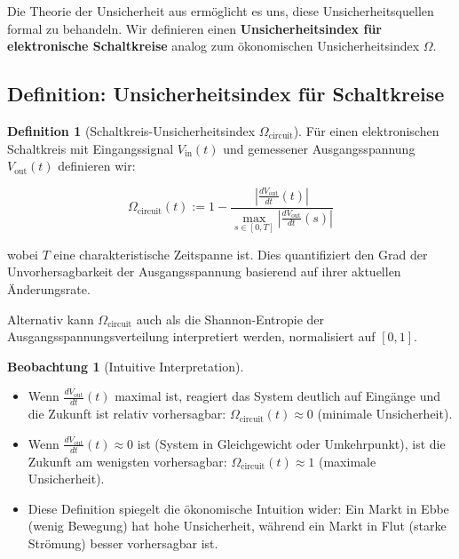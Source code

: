 \documentclass[a4paper,12pt,twoside]{report}
\theoremstyle{definition}
\newtheorem{definition}{Definition}
\newtheorem{beobachtung}{Beobachtung}
\begin{document}
Die Theorie der Unsicherheit aus \cite{epp_signal} ermöglicht es uns, diese Unsicherheitsquellen formal zu behandeln. Wir definieren einen \textbf{Unsicherheitsindex für elektronische Schaltkreise} analog zum ökonomischen Unsicherheitsindex $\Omega$.

\subsection{Definition: Unsicherheitsindex für Schaltkreise}

\begin{definition}[Schaltkreis-Unsicherheitsindex $\Omega_{\text{circuit}}$]
Für einen elektronischen Schaltkreis mit Eingangssignal $V_{\text{in}}(t)$ und gemessener Ausgangsspannung $V_{\text{out}}(t)$ definieren wir:

\begin{equation}
\Omega_{\text{circuit}}(t) := 1 - \frac{|\frac{dV_{\text{out}}}{dt}(t)|}{\max_{s \in [0,T]} |\frac{dV_{\text{out}}}{dt}(s)|}
\end{equation}

wobei $T$ eine charakteristische Zeitspanne ist. Dies quantifiziert den Grad der Unvorhersagbarkeit der Ausgangsspannung basierend auf ihrer aktuellen Änderungsrate.

Alternativ kann $\Omega_{\text{circuit}}$ auch als die Shannon-Entropie der Ausgangsspannungsverteilung interpretiert werden, normalisiert auf $[0,1]$.
\end{definition}

\begin{beobachtung}[Intuitive Interpretation]

\begin{itemize}
    \item Wenn $\frac{dV_{\text{out}}}{dt}(t)$ maximal ist, reagiert das System deutlich auf Eingänge und die Zukunft ist relativ vorhersagbar: $\Omega_{\text{circuit}}(t) \approx 0$ (minimale Unsicherheit).
    \item Wenn $\frac{dV_{\text{out}}}{dt}(t) \approx 0$ ist (System in Gleichgewicht oder Umkehrpunkt), ist die Zukunft am wenigsten vorhersagbar: $\Omega_{\text{circuit}}(t) \approx 1$ (maximale Unsicherheit).
    \item Diese Definition spiegelt die ökonomische Intuition wider: Ein Markt in Ebbe (wenig Bewegung) hat hohe Unsicherheit, während ein Markt in Flut (starke Strömung) besser vorhersagbar ist.
\end{itemize}

\end{beobachtung}
\end{document}
